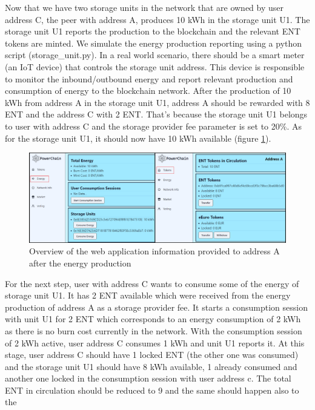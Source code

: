 Now that we have two storage units in the network that are owned by user address C, the peer with address A, produces 10 kWh in the storage unit U1. The storage unit U1
reports the production to the blockchain and the relevant ENT tokens are minted. We simulate the energy production reporting using a python script (storage\_unit.py). In a real world scenario, there should be
a smart meter (an IoT device) that controls the storage unit address. This device is responsible to monitor the inbound/outbound energy and report relevant production and consumption of energy to the blockchain network.
After the production of 10 kWh from address A in the storage unit U1, address A should be rewarded with 8 ENT and the address C with 2 ENT. 
That's because the storage unit U1 belongs to user with address C and the storage provider fee parameter is set to 20\%.
As for the storage unit U1, it should now have 10 kWh available (figure \ref{fig:energy_produced}).\\
\begin{figure}[h!]
    \centering
    \includegraphics[width=\linewidth,frame,scale=1]{Figures/energy_produced.png}
    \caption{Overview of the web application information provided to address A after the energy production}
    \label{fig:energy_produced}
\end{figure}
For the next step, user with address C wants to consume some of the energy of storage unit U1. It has 2 ENT available which were received from the energy production of address A as a storage provider fee.
It starts a consumption session with unit U1 for 2 ENT which corresponds to an energy consumption of 2 kWh as there is no burn cost currently in the network.
With the consumption session of 2 kWh active, user address C consumes 1 kWh and unit U1 reports it. At this stage, user address C should have 1 locked ENT (the other one was consumed) and the storage unit U1
should have 8 kWh available, 1 already consumed and another one locked in the consumption session with user address c. The total ENT in circulation should be reduced to 9 and the same should happen also to the
